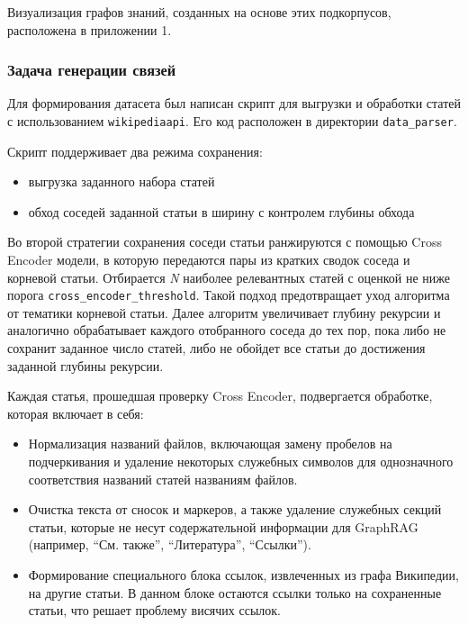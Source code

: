 Визуализация графов знаний,
созданных на основе этих подкорпусов,
расположена в приложении 1.

\subsubsection{Задача генерации связей}

Для формирования датасета был написан скрипт для выгрузки и
обработки статей с использованием \texttt{wikipediaapi}.
Его код расположен в директории \texttt{data\_parser}.

Скрипт поддерживает два режима сохранения:

\begin{itemize}
      \item выгрузка заданного набора статей
      \item обход соседей заданной статьи в ширину с контролем глубины обхода
\end{itemize}

Во второй стратегии сохранения
соседи статьи ранжируются с помощью Cross Encoder модели,
в которую передаются пары из кратких сводок соседа и корневой статьи.
Отбирается \textit{N} наиболее релевантных статей
с оценкой не ниже порога \texttt{cross\_encoder\_threshold}.
Такой подход предотвращает уход алгоритма от тематики корневой статьи.
Далее алгоритм увеличивает глубину рекурсии и аналогично обрабатывает каждого отобранного соседа
до тех пор, пока либо не сохранит заданное число статей,
либо не обойдет все статьи до достижения заданной глубины рекурсии.

Каждая статья, прошедшая проверку Cross Encoder, подвергается обработке,
которая включает в себя:
\begin{itemize}
      \item Нормализация названий файлов, включающая замену пробелов на подчеркивания и
            удаление некоторых служебных символов для
            однозначного соответствия названий статей названиям файлов.
      \item Очистка текста от сносок и маркеров,
            а также удаление служебных секций статьи, которые не несут
            содержательной информации для GraphRAG
            (например, ``См. также'', ``Литература'', ``Ссылки'').
      \item Формирование специального блока ссылок, извлеченных из графа Википедии, на другие статьи.
            В данном блоке остаются ссылки только на сохраненные статьи,
            что решает проблему висячих ссылок.
\end{itemize}

